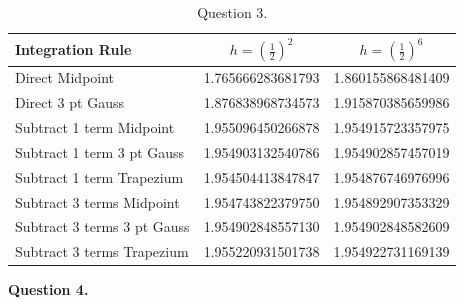 \documentclass[letterpaper, reqno,11pt]{article}
\begin{document}
\begin{table}
\centering
\begin{tabular}{|l|c|c|}
\hline
Integration Rule & \( h = \left(\frac{1}{2}\right)^2 \) & \( h = \left(\frac{1}{2}\right)^6 \) \\
\hline
Direct Midpoint & 1.765666283681793 & 1.860155868481409 \\
\hline
Direct 3 pt Gauss & 1.876838968734573 & 1.915870385659986 \\
\hline
Subtract 1 term Midpoint & 1.955096450266878 & 1.954915723357975 \\
\hline
Subtract 1 term 3 pt Gauss & 1.954903132540786 & 1.954902857457019 \\
\hline
Subtract 1 term Trapezium & 1.954504413847847 & 1.954876746976996 \\
\hline
Subtract 3 terms Midpoint & 1.954743822379750 & 1.954892907353329 \\
\hline
Subtract 3 terms 3 pt Gauss & 1.954902848557130 & 1.954902848582609 \\
\hline
Subtract 3 terms Trapezium & 1.955220931501738 & 1.954922731169139 \\
\hline
\end{tabular}
\caption{Question 3.}
\label{tab:q3}
\end{table}

{\medskip\noindent\bf Question 4.} 
\end{document}
